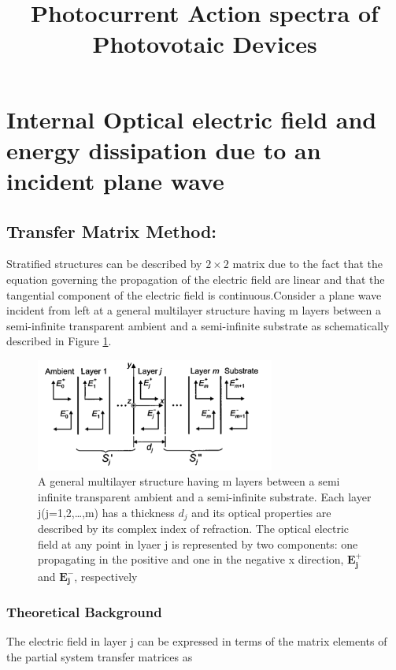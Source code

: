 \documentclass{article}
\begin{document}
\title{Photocurrent Action spectra of Photovotaic Devices}
\maketitle
\section{Internal Optical electric field and energy dissipation due to an incident plane wave
}

\subsection{Transfer Matrix Method:~\cite{pettersson1999modeling}}

Stratified structures can be described by $2\times2$ matrix 
due to the fact that the equation governing the propagation 
of the electric field are linear and that the tangential component 
of the electric field is continuous.Consider a plane wave incident from left at a general multilayer 
structure having m layers between a semi-infinite transparent ambient 
and a semi-infinite substrate as schematically described in Figure
\ref{fig:layers}.
\begin{figure}[h!]
  \centering
    \includegraphics[width=0.7\textwidth]{layers}
  \caption{A general multilayer structure having m layers between a semi 
  infinite transparent ambient and a semi-infinite substrate. 
 Each layer j(j=1,2,…,m) has a thickness $d_{j}$ and its optical properties are
 described by its complex index of refraction. The optical electric field at any
 point in lyaer j is represented by two components: one propagating in the
 positive and one in the negative x direction, $\mathbf{E_{j}^{+}}$ and
 $\mathbf{E_{j}^{-}}$, respectively} \label{fig:layers} 
\end{figure}
\subsubsection{Theoretical Background}
The electric field in layer j can be expressed in terms of the matrix elements
of the partial system transfer matrices as
\end{document}
